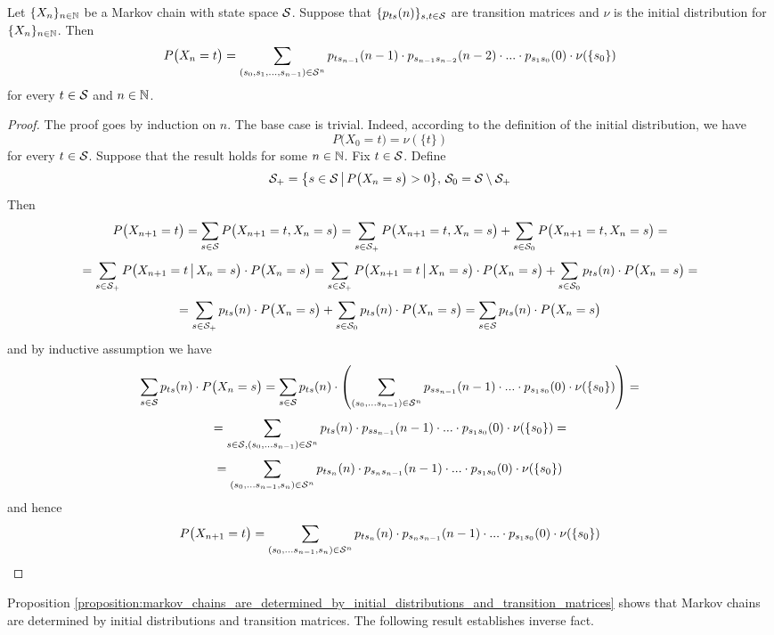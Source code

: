 \begin{proposition}\label{proposition:markov_chains_are_determined_by_initial_distributions_and_transition_matrices}
Let $\{X_n\}_{n\in {\mathbb N}}$ be a Markov chain with state space ${\mathcal S}$. Suppose that $\{p_{ts}(n)\}_{s,t\in {\mathcal S}}$ are transition matrices and $\nu$ is the initial distribution for $\{X_n\}_{n\in {\mathbb N}}$. Then
$$P\big(X_n = t\big) = \sum_{(s_0,s_1,...,s_{n-1})\in {\mathcal S}^{n}}p_{ts_{n-1}}(n-1)\cdot p_{s_{n-1}s_{n-2}}(n-2) \cdot ... \cdot p_{s_{1}s_0}(0)\cdot \nu(\{s_0\})$$
for every $t\in {\mathcal S}$ and $n\in {\mathbb N}$.
\end{proposition}
\begin{proof}
The proof goes by induction on $n$. The base case is trivial. Indeed, according to the definition of the initial distribution, we have
$$P\big(X_0 = t\big) = \nu(\{t\})$$
for every $t\in {\mathcal S}$. Suppose that the result holds for some $n\in {\mathbb N}$. Fix $t\in {\mathcal S}$. Define
$${\mathcal S}_+ = \big\{s\in {\mathcal S}\,\big|\,P\big(X_n = s\big)>0\big\},\,{\mathcal S}_0 = {\mathcal S}\setminus {\mathcal S}_+$$
Then
$$P\big(X_{n+1} = t\big) = \sum_{s\in {\mathcal S}}P\big(X_{n+1} = t,X_n=s\big) = \sum_{s\in {\mathcal S}_+}P\big(X_{n+1} = t,X_n=s\big) + \sum_{s\in {\mathcal S}_0}P\big(X_{n+1} = t,X_n=s\big) = $$
$$= \sum_{s\in {\mathcal S}_+}P\big(X_{n+1} = t\,\big|\,X_n=s\big)\cdot P\big(X_n=s\big) = \sum_{s\in {\mathcal S}_+}P\big(X_{n+1} = t\,\big|\,X_n=s\big)\cdot P\big(X_n=s\big) + \sum_{s\in {\mathcal S}_0}p_{ts}(n)\cdot P\big(X_n=s\big)=$$
$$=\sum_{s\in {\mathcal S}_+}p_{ts}(n)\cdot P\big(X_n=s\big) + \sum_{s\in {\mathcal S}_0}p_{ts}(n)\cdot P\big(X_n=s\big) = \sum_{s\in {\mathcal S}}p_{ts}(n)\cdot P\big(X_n=s\big)$$
and by inductive assumption we have
$$\sum_{s\in {\mathcal S}}p_{ts}(n)\cdot P\big(X_n=s\big) = \sum_{s\in {\mathcal S}} p_{ts}(n)\cdot \left(\sum_{(s_0,...s_{n-1})\in {\mathcal S}^n} p_{ss_{n-1}}(n-1)\cdot ... \cdot p_{s_1s_0}(0)\cdot \nu(\{s_0\})\right) = $$
$$= \sum_{s\in {\mathcal S},(s_0,...s_{n-1})\in {\mathcal S}^n} p_{ts}(n)\cdot p_{ss_{n-1}}(n-1)\cdot ... \cdot p_{s_1s_0}(0)\cdot \nu(\{s_0\}) =$$
$$=\sum_{(s_0,...s_{n-1},s_n)\in {\mathcal S}^n} p_{ts_n}(n)\cdot p_{s_ns_{n-1}}(n-1)\cdot ... \cdot p_{s_1s_0}(0)\cdot \nu(\{s_0\})$$
and hence
$$P\big(X_{n+1} = t\big) = \sum_{(s_0,...s_{n-1},s_n)\in {\mathcal S}^n} p_{ts_n}(n)\cdot p_{s_ns_{n-1}}(n-1)\cdot ... \cdot p_{s_1s_0}(0)\cdot \nu(\{s_0\})$$
\end{proof}
\noindent
Proposition \ref{proposition:markov_chains_are_determined_by_initial_distributions_and_transition_matrices} shows that Markov chains are determined by initial distributions and transition matrices. The following result establishes inverse fact.



